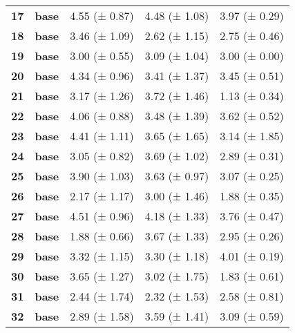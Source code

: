 \begin{longtable}{lllll}
\cline{1-5}
\textbf{17} & \textbf{base} & 4.55 (± 0.87) & 4.48 (± 1.08) & 3.97 (± 0.29) \\
\cline{1-5}
\textbf{18} & \textbf{base} & 3.46 (± 1.09) & 2.62 (± 1.15) & 2.75 (± 0.46) \\
\cline{1-5}
\textbf{19} & \textbf{base} & 3.00 (± 0.55) & 3.09 (± 1.04) & 3.00 (± 0.00) \\
\cline{1-5}
\textbf{20} & \textbf{base} & 4.34 (± 0.96) & 3.41 (± 1.37) & 3.45 (± 0.51) \\
\cline{1-5}
\textbf{21} & \textbf{base} & 3.17 (± 1.26) & 3.72 (± 1.46) & 1.13 (± 0.34) \\
\cline{1-5}
\textbf{22} & \textbf{base} & 4.06 (± 0.88) & 3.48 (± 1.39) & 3.62 (± 0.52) \\
\cline{1-5}
\textbf{23} & \textbf{base} & 4.41 (± 1.11) & 3.65 (± 1.65) & 3.14 (± 1.85) \\
\cline{1-5}
\textbf{24} & \textbf{base} & 3.05 (± 0.82) & 3.69 (± 1.02) & 2.89 (± 0.31) \\
\cline{1-5}
\textbf{25} & \textbf{base} & 3.90 (± 1.03) & 3.63 (± 0.97) & 3.07 (± 0.25) \\
\cline{1-5}
\textbf{26} & \textbf{base} & 2.17 (± 1.17) & 3.00 (± 1.46) & 1.88 (± 0.35) \\
\cline{1-5}
\textbf{27} & \textbf{base} & 4.51 (± 0.96) & 4.18 (± 1.33) & 3.76 (± 0.47) \\
\cline{1-5}
\textbf{28} & \textbf{base} & 1.88 (± 0.66) & 3.67 (± 1.33) & 2.95 (± 0.26) \\
\cline{1-5}
\textbf{29} & \textbf{base} & 3.32 (± 1.15) & 3.30 (± 1.18) & 4.01 (± 0.19) \\
\cline{1-5}
\textbf{30} & \textbf{base} & 3.65 (± 1.27) & 3.02 (± 1.75) & 1.83 (± 0.61) \\
\cline{1-5}
\textbf{31} & \textbf{base} & 2.44 (± 1.74) & 2.32 (± 1.53) & 2.58 (± 0.81) \\
\cline{1-5}
\textbf{32} & \textbf{base} & 2.89 (± 1.58) & 3.59 (± 1.41) & 3.09 (± 0.59) \\
\cline{1-5}
\end{longtable}

